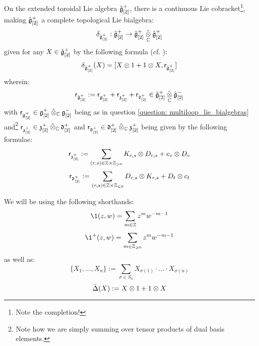         \begin{corollary} \label{coro: extended_toroidal_lie_bialgebras}
            On the extended toroidal Lie algebra $\hat{\mathfrak{g}}_{[2]}^+$, there is a continuous Lie cobracket\footnote{Note the completion!}, making $\hat{\mathfrak{g}}_{[2]}^+$ a complete topological Lie bialgebra:
                $$\delta_{\hat{\g}_{[2]}^+}: \hat{\g}_{[2]}^+ \to \hat{\g}_{[2]}^+ \hattensor_{\bbC} \hat{\g}_{[2]}^+$$
            given for any $X \in \hat{\mathfrak{g}}_{[2]}^+$ by the following formula (cf. \cite{etingof_kazhdan_quantisation_1}):
                $$\delta_{\hat{\g}_{[2]}^+}(X) = [ X \tensor 1 + 1 \tensor X, \sfr_{\hat{\g}_{[2]}^+} ]$$
            wherein:
                $$\sfr_{\hat{\g}_{[2]}^+} := \sfr_{\g_{[2]}^+} + \sfr_{\z_{[2]}^+} + \sfr_{\d_{[2]}^+} \in \hat{\g}_{[2]}^+ \hattensor_{\bbC} \hat{\g}_{[2]}^-$$
            with $\sfr_{\g_{[2]}^+} \in \g_{[2]}^+ \hattensor_{\bbC} \g_{[2]}^-$ being as in question \ref{question: multiloop_lie_bialgebras} and\footnote{Note how we are simply summing over tensor products of dual basis elements.} $\sfr_{\z_{[2]}^+} \in \z_{[2]}^+ \hattensor_{\bbC} \d_{[2]}^+$ and $\sfr_{\d_{[2]}^+} \in \d_{[2]}^+ \hattensor_{\bbC} \z_{[2]}^+$ being given by the following formulae:
                $$\sfr_{\z_{[2]}^+} := \sum_{(r, s) \in \Z \x \Z_{> 0}} K_{r, s} \tensor D_{r, s} + c_v \tensor D_v$$
                $$\sfr_{\d_{[2]}^+} := \sum_{(r, s) \in \Z \x \Z_{\leq 0}} D_{r, s} \tensor K_{r, s} + D_t \tensor c_t$$
        \end{corollary}
    
        \begin{convention}
            We will be using the following shorthands:
                $$\1(z, w) = \sum_{m \in \Z} z^m w^{-m - 1}$$
                $$\1^+(z, w) = \sum_{m \in \Z_{\geq 0}} z^m w^{-m - 1}$$
            as well as:
                $$\{ X_1, ..., X_n \} := \sum_{\sigma \in S_n} X_{\sigma(1)} \cdot ... \cdot X_{\sigma(n)}$$
                $$\bar{\Delta}(X) := X \tensor 1 + 1 \tensor X$$
        \end{convention}

